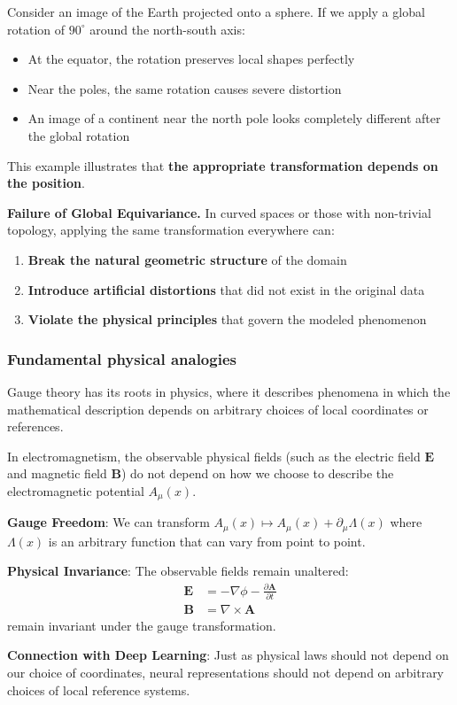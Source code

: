 \begin{example}
Consider an image of the Earth projected onto a sphere. If we apply a global rotation of $90^\circ$ around the north-south axis:
\begin{itemize}
    \item At the equator, the rotation preserves local shapes perfectly
    \item Near the poles, the same rotation causes severe distortion
    \item An image of a continent near the north pole looks completely different after the global rotation
\end{itemize}
This example illustrates that \textbf{the appropriate transformation depends on the position}.
\end{example}

\textbf{Failure of Global Equivariance.} In curved spaces or those with non-trivial topology, applying the same transformation everywhere can:
\begin{enumerate}
    \item \textbf{Break the natural geometric structure} of the domain
    \item \textbf{Introduce artificial distortions} that did not exist in the original data
    \item \textbf{Violate the physical principles} that govern the modeled phenomenon
\end{enumerate}

\subsubsection{Fundamental physical analogies}

Gauge theory has its roots in physics, where it describes phenomena in which the mathematical description depends on arbitrary choices of local coordinates or references.

\begin{example}
In electromagnetism, the observable physical fields (such as the electric field $\mathbf{E}$ and magnetic field $\mathbf{B}$) do not depend on how we choose to describe the electromagnetic potential $A_\mu(x)$.

\textbf{Gauge Freedom}: We can transform $A_\mu(x) \mapsto A_\mu(x) + \partial_\mu \Lambda(x)$ where $\Lambda(x)$ is an arbitrary function that can vary from point to point.

\textbf{Physical Invariance}: The observable fields remain unaltered:
\begin{align}
\mathbf{E} &= -\nabla \phi - \frac{\partial \mathbf{A}}{\partial t} \\
\mathbf{B} &= \nabla \times \mathbf{A}
\end{align}
remain invariant under the gauge transformation.

\textbf{Connection with Deep Learning}: Just as physical laws should not depend on our choice of coordinates, neural representations should not depend on arbitrary choices of local reference systems.
\end{example}

